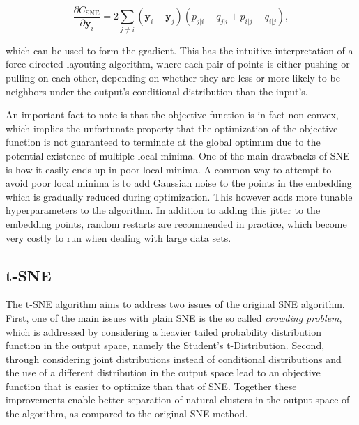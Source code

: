 \begin{equation}
\frac{\partial C_{\text{SNE}}}{\partial \mathbf{y}_i} = 2 \sum_{j \neq i} (\mathbf{y}_i - \mathbf{y}_j)(p_{j \vert i} - q_{j \vert i} + p_{i \vert j} - q_{i \vert j}),
\label{eq:c_sne_grad}
\end{equation}

which can be used to form the gradient. This has the intuitive interpretation of a force directed layouting algorithm, where each pair of points is either pushing or pulling on each other, depending on whether they are less or more likely to be neighbors under the output's conditional distribution than the input's.

An important fact to note is that the objective function is in fact non-convex, which implies the unfortunate property that the optimization of the objective function is not guaranteed to terminate at the global optimum due to the potential existence of multiple local minima. One of the main drawbacks of SNE is how it easily ends up in poor local minima. A common way to attempt to avoid poor local minima is to add Gaussian noise to the points in the embedding which is gradually reduced during optimization. This however adds more tunable hyperparameters to the algorithm. In addition to adding this jitter to the embedding points, random restarts are recommended in practice, which become very costly to run when dealing with large data sets.

\subsection{t-SNE}
\label{subsection:tsne}

The t-SNE algorithm aims to address two issues of the original SNE algorithm. First, one of the main issues with plain SNE is the so called \textit{crowding problem}, which is addressed by considering a heavier tailed probability distribution function in the output space, namely the Student's t-Distribution. Second, through considering joint distributions instead of conditional distributions and the use of a different distribution in the output space lead to an objective function that is easier to optimize than that of SNE. Together these improvements enable better separation of natural clusters in the output space of the algorithm, as compared to the original SNE method.

